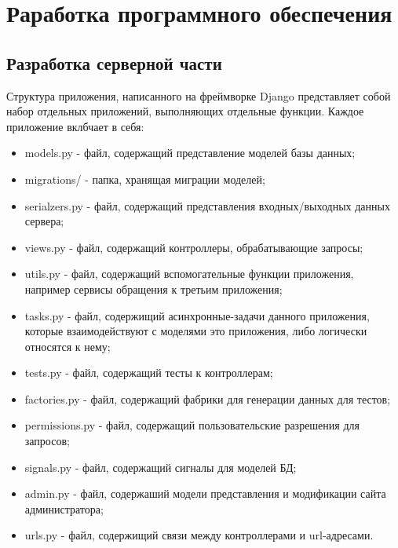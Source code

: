\section{Раработка программного обеспечения}

\subsection{Разработка серверной части}

Структура приложения, написанного на фреймворке Django представляет собой набор отдельных приложений, выполняющих отдельные функции.
Каждое приложение вклбчает в себя:
\begin{itemize}
    \item models.py - файл, содержащий представление моделей базы данных;
    \item migrations/ - папка, хранящая миграции моделей;
    \item serialzers.py - файл, содержащий представления входных/выходных данных сервера;
    \item views.py - файл, содержащий контроллеры, обрабатывающие запросы;
    \item utils.py - файл, содержащий вспомогательные функции приложения, например сервисы обращения к третьим приложения;
    \item tasks.py - файл, содержищий асинхронные-задачи данного приложения, которые взаимодействуют с моделями это приложения, либо логически относятся к нему;
    \item tests.py - файл, содержащий тесты к контроллерам;
    \item factories.py - файл, содержащий фабрики для генерации данных для тестов;
    \item permissions.py - файл, содержащий пользовательские разрешения для запросов;
    \item signals.py - файл, содержащий сигналы для моделей БД;
    \item admin.py - файл, содержаший модели представления и модификации сайта администратора;
    \item urls.py - файл, содержищий связи между контроллерами и url-адресами.
\end{itemize}

